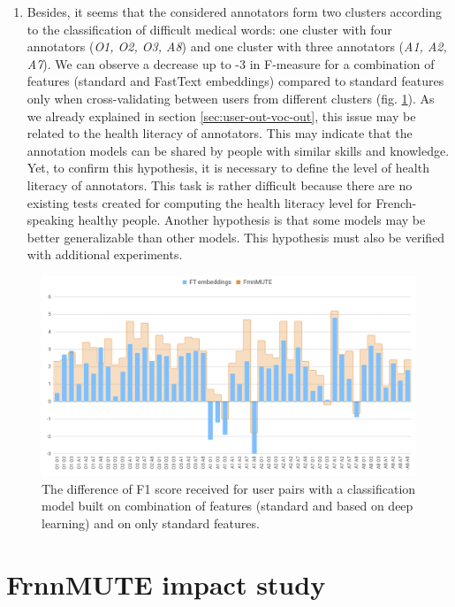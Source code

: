 \begin{enumerate}[listparindent=1.5em]
    \item Besides, it seems that the considered annotators form two clusters according to the classification of difficult medical words: one cluster with four annotators ({\it O1, O2, O3, A8}) and one cluster with three annotators ({\it A1, A2, A7}). We can observe a decrease up to -3 in F-measure for a combination of features (standard and FastText embeddings) compared to standard features only when cross-validating between users from different clusters (fig. \ref{fig:f1-diff-frnnmute-ft}). As we already explained in section \ref{sec:user-out-voc-out}, this issue may be related to the health literacy of annotators. This may indicate that the annotation models can be shared by people with similar skills and knowledge. Yet, to confirm this hypothesis, it is necessary to define the level of health literacy of annotators. This task is rather difficult because there are no existing tests created for computing the health literacy level for French-speaking healthy people. Another hypothesis is that some models may be better generalizable than other models. This hypothesis must also be verified with additional experiments.
\end{enumerate}
\begin{figure}[h]
    \centering
    \includegraphics[width=15cm]{Images/f1-diff-frnnmute-ft.png}
    \caption{The difference of F1 score received for user pairs with a classification model built on combination of features (standard and based on deep learning) and on only standard features. }
    \label{fig:f1-diff-frnnmute-ft}
\end{figure} 

\section{FrnnMUTE impact study}
\label{sec:frnnmute-study}

